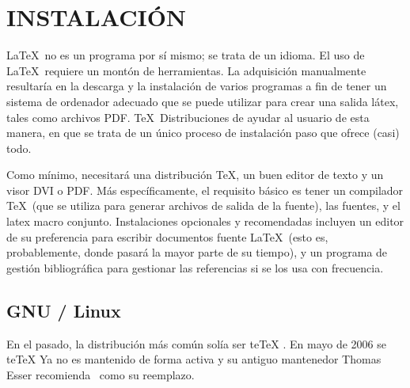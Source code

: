 \chapter{INSTALACIÓN}
	
	\LaTeX\ no es un programa por sí mismo; se trata de un idioma. El uso de \LaTeX\ requiere un montón de herramientas. La adquisición manualmente resultaría en la descarga y la instalación de varios programas a fin de tener un sistema de ordenador adecuado que se puede utilizar para crear una salida látex, tales como archivos PDF. \TeX\ Distribuciones de ayudar al usuario de esta manera, en que se trata de un único proceso de instalación paso que ofrece (casi) todo.
	
	Como mínimo, necesitará una distribución \TeX, un buen editor de texto y un visor DVI o PDF. Más específicamente, el requisito básico es tener un compilador \TeX\ (que se utiliza para generar archivos de salida de la fuente), las fuentes, y el latex macro conjunto. Instalaciones opcionales y recomendadas incluyen un editor de su preferencia para escribir documentos fuente \LaTeX\ (esto es, probablemente, donde pasará la mayor parte de su tiempo), y un programa de gestión bibliográfica para gestionar las referencias si se los usa con frecuencia.
	
	\section{GNU / Linux}
		
%		

		En el pasado, la distribución más común solía ser teTeX . En mayo de 2006 se teTeX Ya no es mantenido de forma activa y su antiguo mantenedor Thomas Esser recomienda \TeXLive\ como su reemplazo.
		
